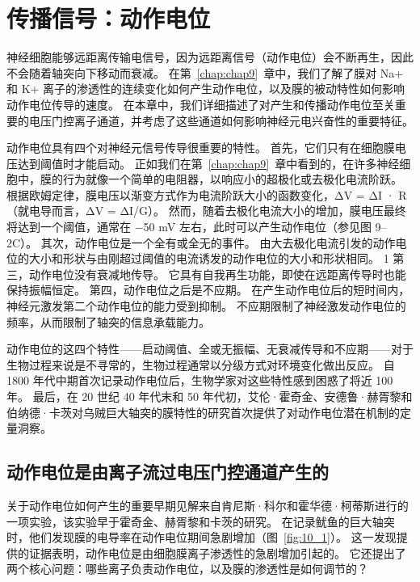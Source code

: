 \chapter{传播信号：动作电位} \label{chap:chap10}

神经细胞能够远距离传输电信号，因为远距离信号（动作电位）会不断再生，因此不会随着轴突向下移动而衰减。 
在第~\ref{chap:chap9}~章中，我们了解了膜对 Na+ 和 K+ 离子的渗透性的连续变化如何产生动作电位，以及膜的被动特性如何影响动作电位传导的速度。 
在本章中，我们详细描述了对产生和传播动作电位至关重要的电压门控离子通道，并考虑了这些通道如何影响神经元电兴奋性的重要特征。


动作电位具有四个对神经元信号传导很重要的特性。
首先，它们只有在细胞膜电压达到阈值时才能启动。
正如我们在第~\ref{chap:chap9}~章中看到的，在许多神经细胞中，膜的行为就像一个简单的电阻器，以响应小的超极化或去极化电流阶跃。
根据欧姆定律，膜电压以渐变方式作为电流阶跃大小的函数变化，ΔV = ΔI · R（就电导而言，ΔV = ΔI/G）。
然而，随着去极化电流大小的增加，膜电压最终将达到一个阈值，通常在 −50 mV 左右，此时可以产生动作电位（参见图 9–2C）。
其次，动作电位是一个全有或全无的事件。
由大去极化电流引发的动作电位的大小和形状与由刚超过阈值的电流诱发的动作电位的大小和形状相同。
1 第三，动作电位没有衰减地传导。
它具有自我再生功能，即使在远距离传导时也能保持振幅恒定。
第四，动作电位之后是不应期。
在产生动作电位后的短时间内，神经元激发第二个动作电位的能力受到抑制。
不应期限制了神经激发动作电位的频率，从而限制了轴突的信息承载能力。


动作电位的这四个特性——启动阈值、全或无振幅、无衰减传导和不应期——对于生物过程来说是不寻常的，生物过程通常以分级方式对环境变化做出反应。
自 1800 年代中期首次记录动作电位后，生物学家对这些特性感到困惑了将近 100 年。
最后，在 20 世纪 40 年代末和 50 年代初，艾伦·霍奇金、安德鲁·赫胥黎和伯纳德·卡茨对乌贼巨大轴突的膜特性的研究首次提供了对动作电位潜在机制的定量洞察。



\section{动作电位是由离子流过电压门控通道产生的}

关于动作电位如何产生的重要早期见解来自肯尼斯·科尔和霍华德·柯蒂斯进行的一项实验，该实验早于霍奇金、赫胥黎和卡茨的研究。
在记录鱿鱼的巨大轴突时，他们发现膜的电导率在动作电位期间急剧增加（图~\ref{fig:10_1}）。
这一发现提供的证据表明，动作电位是由细胞膜离子渗透性的急剧增加引起的。
它还提出了两个核心问题：哪些离子负责动作电位，以及膜的渗透性是如何调节的？


